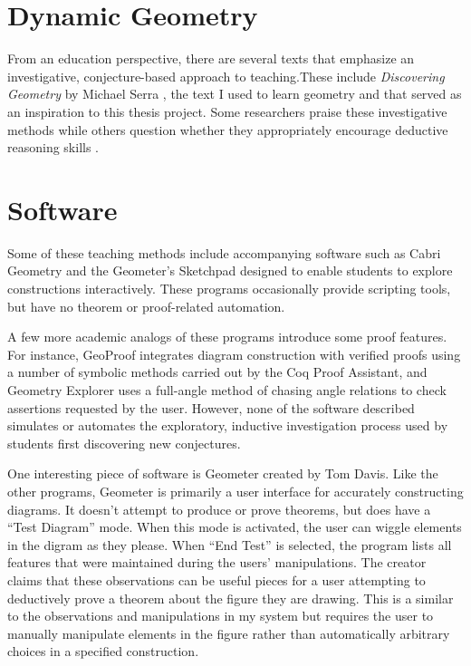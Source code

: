 \section{Dynamic Geometry}
From an education perspective, there are several texts that emphasize
an investigative, conjecture-based approach to teaching.These include
\emph{Discovering Geometry} by Michael Serra \cite{serraDiscovering},
the text I used to learn geometry and that served as an inspiration to
this thesis project.  Some researchers praise these investigative
methods \cite{geoTransformations} while others question whether they
appropriately encourage deductive reasoning skills \cite{geoTeaching}.

\section{Software}
Some of these teaching methods include accompanying software such as
Cabri Geometry \cite{cabri} and the Geometer's Sketchpad
\cite{geoSketchpad} designed to enable students to explore
constructions interactively.  These programs occasionally provide
scripting tools, but have no theorem or proof-related automation.

A few more academic analogs of these programs introduce some proof
features.  For instance, GeoProof \cite{geoProof} integrates diagram
construction with verified proofs using a number of symbolic methods
carried out by the Coq Proof Assistant, and Geometry Explorer
\cite{geoExplorer} uses a full-angle method of chasing angle relations
to check assertions requested by the user.  However, none of the
software described simulates or automates the exploratory, inductive
investigation process used by students first discovering new
conjectures.

One interesting piece of software is Geometer \cite{geometer} created
by Tom Davis. Like the other programs, Geometer is primarily a user
interface for accurately constructing diagrams. It doesn't attempt to
produce or prove theorems, but does have a ``Test Diagram'' mode. When
this mode is activated, the user can wiggle elements in the digram as
they please. When ``End Test'' is selected, the program lists all
features that were maintained during the users' manipulations. The
creator claims that these observations can be useful pieces for a user
attempting to deductively prove a theorem about the figure they are
drawing. This is a similar to the observations and manipulations in my
system but requires the user to manually manipulate elements in the
figure rather than automatically arbitrary choices in a specified
construction.
